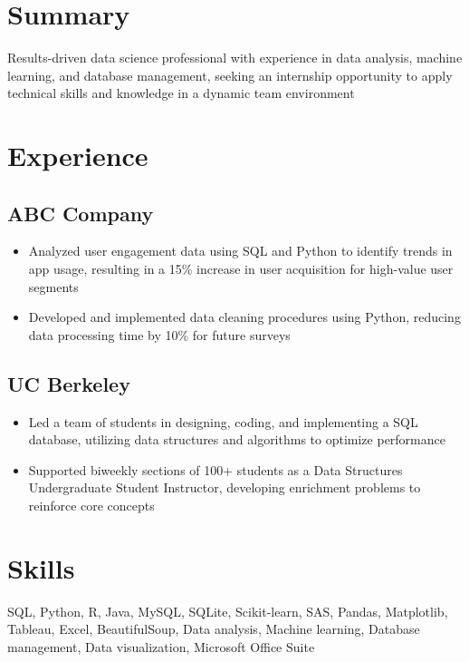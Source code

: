 \documentclass[11pt]{article}
\begin{document}
\section*{Summary}
Results-driven data science professional with experience in data analysis, machine learning, and database management, seeking an internship opportunity to apply technical skills and knowledge in a dynamic team environment

\section*{Experience}
\subsection*{ABC Company}
\begin{itemize}
\item Analyzed user engagement data using SQL and Python to identify trends in app usage, resulting in a 15\% increase in user acquisition for high-value user segments
\item Developed and implemented data cleaning procedures using Python, reducing data processing time by 10\% for future surveys
\end{itemize}

\subsection*{UC Berkeley}
\begin{itemize}
\item Led a team of students in designing, coding, and implementing a SQL database, utilizing data structures and algorithms to optimize performance
\item Supported biweekly sections of 100+ students as a Data Structures Undergraduate Student Instructor, developing enrichment problems to reinforce core concepts
\end{itemize}

\section*{Skills}
SQL, Python, R, Java, MySQL, SQLite, Scikit-learn, SAS, Pandas, Matplotlib, Tableau, Excel, BeautifulSoup, Data analysis, Machine learning, Database management, Data visualization, Microsoft Office Suite
\end{document}
